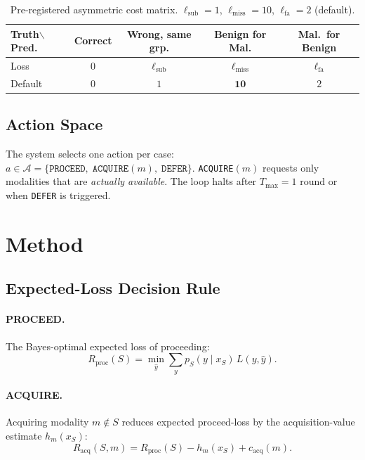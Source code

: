 \documentclass[conference]{IEEEtran}
\newcommand{\1}{\mathbf{1}}
\begin{document}
\begin{table}[H]
  \centering
  \caption{%
    Pre-registered asymmetric cost matrix.
    $\ell_{\text{sub}}=1$, $\ell_{\text{miss}}=10$, $\ell_{\text{fa}}=2$ (default).
  }
  \label{tab:cost}
  \renewcommand{\arraystretch}{1.2}
  \small
  \begin{tabular}{lcccc}
    \toprule
    \textbf{Truth$\backslash$Pred.}
      & \textbf{Correct}
      & \textbf{Wrong, same grp.}
      & \textbf{Benign for Mal.}
      & \textbf{Mal.\ for Benign} \\
    \midrule
    Loss & $0$ & $\ell_{\text{sub}}$ & $\ell_{\text{miss}}$ & $\ell_{\text{fa}}$ \\
    Default & $0$ & $1$ & $\mathbf{10}$ & $2$ \\
    \bottomrule
  \end{tabular}
\end{table}

\subsection{Action Space}

The system selects one action per case:
$a \in \mathcal{A} = \{\texttt{PROCEED},\;\texttt{ACQUIRE}(m),\;\texttt{DEFER}\}.$
\texttt{ACQUIRE}$(m)$ requests only modalities that are \emph{actually available}.
The loop halts after $T_{\max}=1$ round or when \texttt{DEFER} is triggered.

\section{Method}
\label{sec:method}

\subsection{Expected-Loss Decision Rule}

\paragraph{PROCEED.}
The Bayes-optimal expected loss of proceeding:
\begin{equation}
  R_{\text{proc}}(S) = \min_{\hat{y}} \sum_{y} p_S(y \mid x_S)\, L(y, \hat{y}).
  \label{eq:Rproc}
\end{equation}

\paragraph{ACQUIRE.}
Acquiring modality $m \notin S$ reduces expected proceed-loss by the
acquisition-value estimate $h_m(x_S)$:
\begin{equation}
  R_{\text{acq}}(S, m) = R_{\text{proc}}(S) - h_m(x_S) + c_{\text{acq}}(m).
  \label{eq:Racq}
\end{equation}
\end{document}
